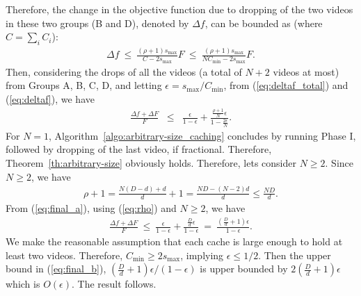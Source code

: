 \documentclass[conference]{IEEEtran}
\begin{document}
Therefore, the change in the objective function due to dropping of the two videos in these two groups (B and D), denoted by $\Delta f$, can be bounded as (where $C = \sum_i C_i$):
\begin{eqnarray}
\Delta f \ \leq \ \frac{(\rho+1) s_{\max}}{C-2 s_{\max}} F \ \leq \  \frac{(\rho+1) s_{\max}}{N C_{\min}-2 s_{\max}} F.
\label{eq:deltaf}
\end{eqnarray}
Then, considering the drops of all the videos (a total of $N+2$ videos at most) from Groups A, B, C, D, and letting $\epsilon = s_{\max}/C_{\min}$, from (\ref{eq:deltaf_total}) and (\ref{eq:deltaf}), we have
\begin{eqnarray}
\frac{\Delta f + \Delta F}{F} & \leq & \frac{\epsilon}{1-\epsilon}  + \frac{\frac{\rho+1}{N} \epsilon}{1 - \frac{2\epsilon}{N}}. \label{eq:final_a}
\end{eqnarray}
For $N=1$, Algorithm~\ref{algo:arbitrary-size_caching} concludes by running Phase I, followed by dropping of the last video, if fractional. Therefore, Theorem~\ref{th:arbitrary-size} obviously holds. Therefore, lets consider $N \geq 2$. Since $N\geq 2$, we have
\begin{eqnarray}
\rho + 1 = \frac{N(D-d) + d}{d} + 1 = \frac{ND - (N-2)d}{d} \leq \frac{ND}{d}. 
\label{eq:rho}
\end{eqnarray}
From (\ref{eq:final_a}), using (\ref{eq:rho}) and $N \geq 2$, we have
\begin{eqnarray}
\frac{\Delta f + \Delta F}{F} \ \leq \ \frac{\epsilon}{1-\epsilon}  + \frac{\frac{D}{d} \epsilon}{1 - \epsilon} \ = \ \frac{(\frac{D}{d} + 1) \epsilon}{1-\epsilon}. \label{eq:final_b}
\end{eqnarray}
We make the reasonable assumption that each cache is large enough to hold at least two videos. Therefore, $C_{\min} \geq 2 s_{\max}$, implying $\epsilon \leq 1/2$. Then the upper bound in (\ref{eq:final_b}), $(\frac{D}{d} + 1) \epsilon/(1-\epsilon)$ is upper bounded by $2(\frac{D}{d} + 1) \epsilon$ which is $O(\epsilon)$. The result follows. %


\end{document}
